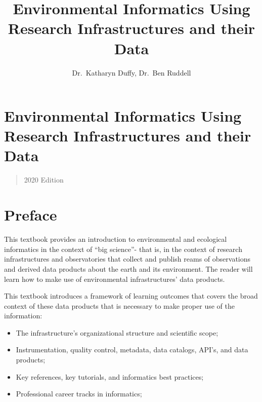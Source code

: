 \documentclass[
  letterpaper,
]{book}
\title{Environmental Informatics Using Research Infrastructures and
their Data}
\author{Dr.~Katharyn Duffy, Dr.~Ben Ruddell}
\date{}
\providecommand{\tightlist}{%
  \setlength{\itemsep}{0pt}\setlength{\parskip}{0pt}}
\renewcommand*\contentsname{Table of contents}
\newcommand\contentsname{Table of contents}
\begin{document}
\frontmatter
\maketitle

\renewcommand*\contentsname{Table of contents}
{
\setcounter{tocdepth}{2}
\tableofcontents
}

\mainmatter
{}

\chapter{Environmental Informatics Using Research Infrastructures and
their
Data}\label{environmental-informatics-using-research-infrastructures-and-their-data}

\begin{quote}
2020 Edition
\end{quote}


\chapter*{Preface}\label{preface}


This textbook provides an introduction to environmental and ecological
informatics in the context of ``big science''- that is, in the context
of research infrastructures and observatories that collect and publish
reams of observations and derived data products about the earth and its
environment. The reader will learn how to make use of environmental
infrastructures' data products.

This textbook introduces a framework of learning outcomes that covers
the broad context of these data products that is necessary to make
proper use of the information:

\begin{itemize}
\tightlist
\item
  The infrastructure's organizational structure and scientific scope;
\item
  Instrumentation, quality control, metadata, data catalogs, API's, and
  data products;
\item
  Key references, key tutorials, and informatics best practices;
\item
  Professional career tracks in informatics;
\end{itemize}
\end{document}
